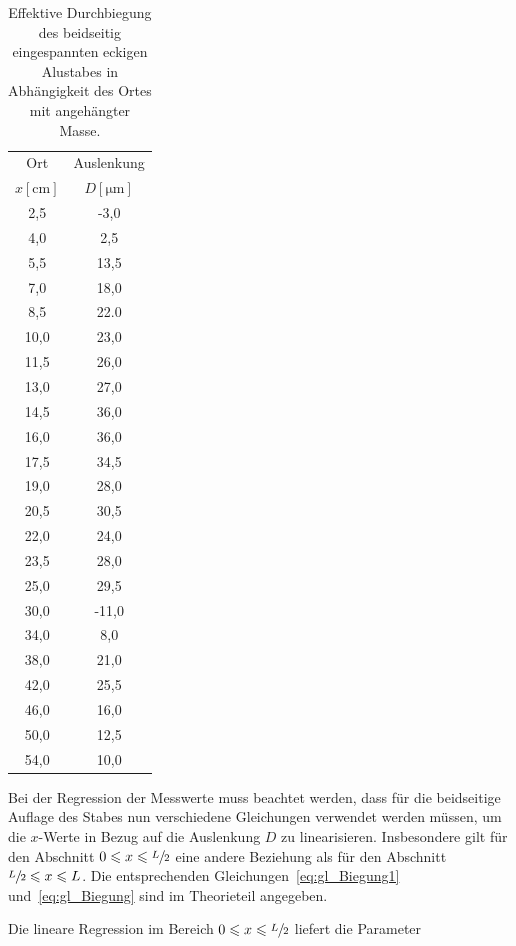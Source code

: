 \documentclass[
  bibliography=totoc,     %
  captions=tableheading,  %
  titlepage=firstiscover, %
]{scrartcl}
\begin{document}
\begin{table}[H]
    \centering
    \caption{Effektive Durchbiegung des beidseitig eingespannten eckigen Alustabes in Abhängigkeit des Ortes mit angehängter Masse.}
    \begin{tabular}{cc}
        \toprule
        {Ort} & {Auslenkung} \\
        {$x[\si{\centi\metre}]$} & {$D[\si{\micro\metre}]$} \\
        \midrule
      2,5   & -3,0  \\
      4,0   &  2,5  \\
      5,5   &  13,5 \\
      7,0   &  18,0 \\
      8,5   & 22.0 \\
      10,0  & 23,0 \\
      11,5  & 26,0 \\
      13,0  & 27,0 \\
      14,5  & 36,0 \\
      16,0  & 36,0 \\
      17,5  & 34,5 \\
      19,0  & 28,0 \\
      20,5  & 30,5 \\
      22,0  & 24,0 \\
      23,5  & 28,0 \\
      25,0  & 29,5 \\
      30,0  &-11,0 \\
      34,0  & 8,0  \\
      38,0  & 21,0 \\
      42,0  & 25,5 \\
      46,0  & 16,0 \\
      50,0  & 12,5 \\
      54,0  & 10,0 \\
        \bottomrule
    \end{tabular}
    \label{tab3:alueckig}
\end{table}
Bei der Regression der Messwerte muss beachtet werden, dass für die beidseitige
Auflage des Stabes nun  verschiedene Gleichungen verwendet werden müssen, um die
$x$-Werte in Bezug auf die Auslenkung $D$ zu linearisieren. Insbesondere gilt
für den Abschnitt $0\leqslant x\leqslant\sfrac{L}{2}$ eine andere Beziehung als
für den Abschnitt $\sfrac{L}{2}\leqslant x\leqslant L$. Die entsprechenden
Gleichungen~\eqref{eq:gl_Biegung1} und~\eqref{eq:gl_Biegung} sind im Theorieteil
angegeben.

Die lineare Regression im Bereich $0\leqslant x\leqslant\sfrac{L}{2}$ liefert die Parameter
\end{document}
